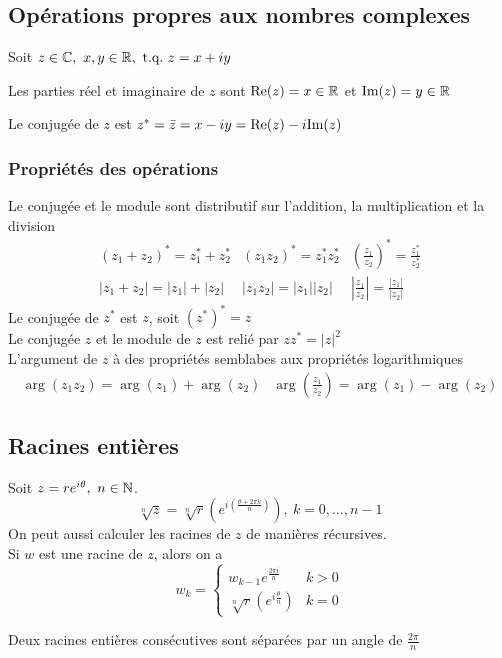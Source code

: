 \subsection{Opérations propres aux nombres complexes}
Soit $z \in \C, \ x, y \in \R, \ \text{t.q.} \ z = x + iy$ 
\begin{definition}
    Les parties réel et imaginaire de $z$ sont $\text{Re}(z) = x \in \mathbb{R}$ et $\text{Im}(z) = y \in \mathbb{R}$
\end{definition}
\begin{definition}
    Le conjugée de $z$ est $z^* = \bar{z} = x - iy = \text{Re}(z) - i\text{Im}(z)$
\end{definition}

\subsubsection{Propriétés des opérations}
Le conjugée et le module sont distributif sur l'addition, la multiplication et la division
\[
    \begin{matrix}
        \left(z_1 + z_2\right)^* = z_1^* + z_2^* & \left(z_1z_2\right)^* = z_1^{*} z_2^* & \left( \frac{z_1}{z_2}\right)^{*} = \frac{z_1^*}{z_2^*} \\[0.5em]
        \left|z_1 + z_2\right| = |z_1| + |z_2|   & \left|z_1z_2\right| = |z_1||z_2|      & \left| \frac{z_1}{z_2}\right| = \frac{|z_1|}{|z_2|}
    \end{matrix}
\]
Le conjugée de $z^*$ est $z$, soit $\left(z^*\right)^* = z$ \\
Le conjugée $z$ et le module de $z$ est relié par $zz^* = |z|^2$ \\
L'argument de $z$ à des propriétés semblabes aux propriétés logarithmiques
\[
    \begin{matrix}
        \arg(z_1z_2) = \arg(z_1) + \arg(z_2) & \arg\left( \frac{z_1}{z_2}\right) = \arg(z_1) - \arg(z_2)
    \end{matrix}
\]

\subsection{Racines entières}
Soit $z = re^{i\theta},\ n \in \mathbb{N}$.
\[
    \sqrt[n]{z} = \sqrt[n]{r} \left( e^{i \left( \frac{\theta + 2\pi k}{n} \right) } \right), \ k = 0, \dots, n - 1
\]
On peut aussi calculer les racines de $z$ de manières récursives. \\
Si $w$ est une racine de $z$, alors on a
\[
    w_k = \begin{cases}
        w_{k - 1}e^{ \frac{2\pi i}{n} }                    & k > 0 \\[0.5em]
        \sqrt[n]{r} \left( e^{i \frac{\theta}{n} } \right) & k = 0
    \end{cases}
\]
\begin{remark}
    Deux racines entières consécutives sont séparées par un angle de $\frac{2\pi}{n}$
\end{remark}

